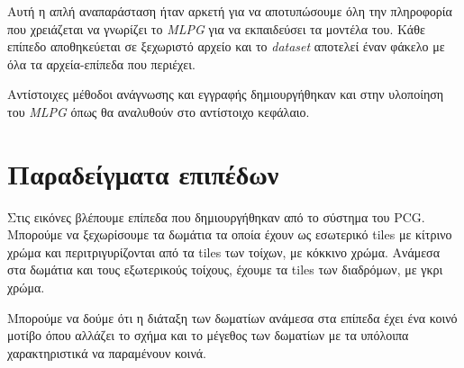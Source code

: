 Αυτή η απλή αναπαράσταση ήταν αρκετή για να αποτυπώσουμε όλη την πληροφορία που χρειάζεται να γνωρίζει το \textit{MLPG} για να εκπαιδεύσει τα μοντέλα του. Κάθε επίπεδο αποθηκεύεται σε ξεχωριστό αρχείο και το \textit{dataset} αποτελεί έναν φάκελο με όλα τα αρχεία-επίπεδα που περιέχει.
\par
Αντίστοιχες μέθοδοι ανάγνωσης και εγγραφής δημιουργήθηκαν και στην υλοποίηση του \textit{MLPG} όπως θα αναλυθούν στο αντίστοιχο κεφάλαιο.

\section{Παραδείγματα επιπέδων}
\par
Στις εικόνες βλέπουμε επίπεδα που δημιουργήθηκαν από το σύστημα του PCG. Μπορούμε να ξεχωρίσουμε τα δωμάτια τα οποία έχουν ως εσωτερικό tiles με κίτρινο χρώμα και περιτριγυρίζονται από τα tiles των τοίχων, με κόκκινο χρώμα. Ανάμεσα στα δωμάτια και τους εξωτερικούς τοίχους, έχουμε τα tiles των διαδρόμων, με γκρι χρώμα. 
\par
Μπορούμε να δούμε ότι η διάταξη των δωματίων ανάμεσα στα επίπεδα έχει ένα κοινό μοτίβο όπου αλλάζει το σχήμα και το μέγεθος των δωματίων με τα υπόλοιπα χαρακτηριστικά να παραμένουν κοινά.

